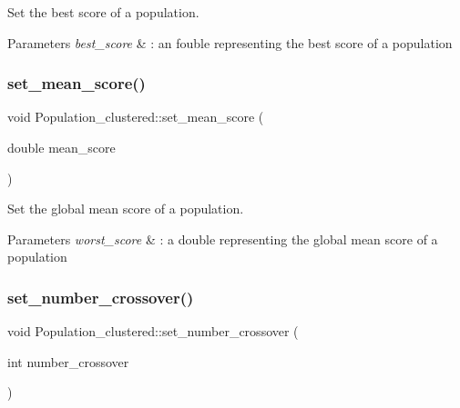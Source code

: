 Set the best score of a population. 


\begin{DoxyParams}{Parameters}
{\em best\+\_\+score} & \+: an fouble representing the best score of a population \\
\hline
\end{DoxyParams}
\mbox{\label{class_population__clustered_a234c028b57507ac9b4c81273a8279b01}} 
\subsubsection{\texorpdfstring{set\+\_\+mean\+\_\+score()}{set\_mean\_score()}}
{\footnotesize\ttfamily void Population\+\_\+clustered\+::set\+\_\+mean\+\_\+score (\begin{DoxyParamCaption}\item[{double}]{mean\+\_\+score }\end{DoxyParamCaption})}



Set the global mean score of a population. 


\begin{DoxyParams}{Parameters}
{\em worst\+\_\+score} & \+: a double representing the global mean score of a population \\
\hline
\end{DoxyParams}
\mbox{\label{class_population__clustered_ac4337d1263af1c208478cfdc20536254}} 
\subsubsection{\texorpdfstring{set\+\_\+number\+\_\+crossover()}{set\_number\_crossover()}}
{\footnotesize\ttfamily void Population\+\_\+clustered\+::set\+\_\+number\+\_\+crossover (\begin{DoxyParamCaption}\item[{int}]{number\+\_\+crossover }\end{DoxyParamCaption})}



